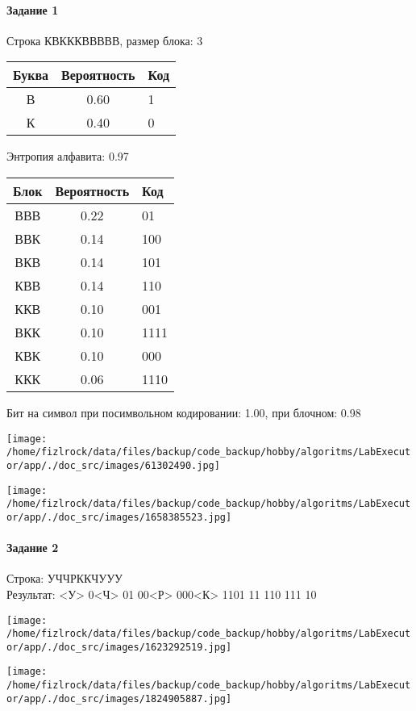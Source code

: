 \documentclass[a4paper, 12pt]{article}
\begin{document}
\paragraph{Задание 1}

Строка КВКККВВВВВ, размер блока: 3
\begin{center}
 \begin{tabular}{ |c|c|l| } 
  \hline
     Буква & Вероятность & Код\\ \hline
В & 0.60 & 1\\\hline
К & 0.40 & 0
\\ \hline \end{tabular}
\end{center}
Энтропия алфавита: 0.97
\begin{center}
 \begin{tabular}{ |c|c|l| } 
  \hline
     Блок & Вероятность & Код\\ \hline
ВВВ & 0.22 & 01\\\hline
ВВК & 0.14 & 100\\\hline
ВКВ & 0.14 & 101\\\hline
КВВ & 0.14 & 110\\\hline
ККВ & 0.10 & 001\\\hline
ВКК & 0.10 & 1111\\\hline
КВК & 0.10 & 000\\\hline
ККК & 0.06 & 1110
\\ \hline \end{tabular}
\end{center}
Бит на символ при посимвольном кодировании: 1.00, при блочном: 0.98

\texttt{[image: /home/fizlrock/data/files/backup/code\_backup/hobby/algoritms/LabExecutor/app/./doc\_src/images/61302490.jpg]}

\texttt{[image: /home/fizlrock/data/files/backup/code\_backup/hobby/algoritms/LabExecutor/app/./doc\_src/images/1658385523.jpg]}
\pagebreak
\paragraph{Задание 2}

Строка: 
УЧЧРККЧУУУ\\
Результат: <У> 0<Ч> 01 00<Р> 000<К> 1101 11 110 111 10

\texttt{[image: /home/fizlrock/data/files/backup/code\_backup/hobby/algoritms/LabExecutor/app/./doc\_src/images/1623292519.jpg]}

\texttt{[image: /home/fizlrock/data/files/backup/code\_backup/hobby/algoritms/LabExecutor/app/./doc\_src/images/1824905887.jpg]}
\end{document}
